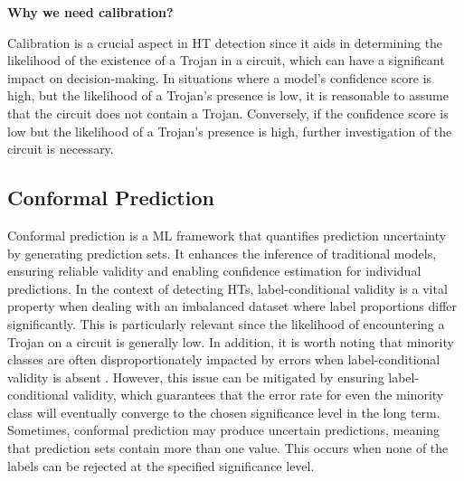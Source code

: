 \textbf{Why we need calibration?}

Calibration is a crucial aspect in HT detection since it aids in determining the likelihood of the existence of a Trojan in a circuit, which can have a significant impact on decision-making. In situations where a model's confidence score is high, but the likelihood of a Trojan's presence is low, it is reasonable to assume that the circuit does not contain a Trojan. Conversely, if the confidence score is low but the likelihood of a Trojan's presence is high, further investigation of the circuit is necessary.

\subsection*{Conformal Prediction}
\label{sec:CP}

Conformal prediction \cite{shafer2008tutorial} is a ML framework that quantifies prediction uncertainty by generating prediction sets. It enhances the inference of traditional models, ensuring reliable validity and enabling confidence estimation for individual predictions. In the context of detecting HTs, label-conditional validity is a vital property when dealing with an imbalanced dataset where label proportions differ significantly. This is particularly relevant since the likelihood of encountering a Trojan on a circuit is generally low. In addition, it is worth noting that minority classes are often disproportionately impacted by errors when label-conditional validity is absent \cite{lofstrom2015bias}. However, this issue can be mitigated by ensuring label-conditional validity, which guarantees that the error rate for even the minority class will eventually converge to the chosen significance level in the long term. Sometimes, conformal prediction may produce uncertain predictions, meaning that prediction sets contain more than one value. This occurs when none of the labels can be rejected at the specified significance level.

